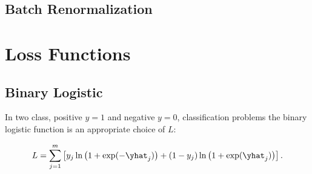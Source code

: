 \subsection{Batch Renormalization}
\label{ml_general:reg:batch_renorm}

\section{Loss Functions}
\label{ml_general:loss_func}


\subsection{Binary Logistic}
\label{ml_general:loss_func:binary_logistic}

In two class, positive $y=1$ and negative $y=0$, classification problems the binary logistic function is an appropriate choice of $L$:

\begin{equation} \label{eq:binary_logistic}
L = \sum_{j=1}^{m} \left[y_{j} \ln\left(1 + \exp(-\yhat_{j})\right) +\left(1-y_{j}\right) \ln\left(1 + \exp(\yhat_{j})\right)\right].
\end{equation}

